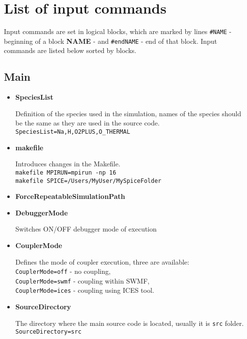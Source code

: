%
%

\chapter{List of input commands}

Input commands are set in logical blocks, which are
marked by lines \texttt{\#NAME} - beginning of 
a block {\bf NAME} - and \texttt{\#endNAME} - end
of that block. Input commands are listed below 
sorted by blocks.



\section{Main}

\begin{itemize}

\item {\bf SpeciesList}

Definition of the species used in the simulation, names of the species should
be the same as they are used in the source code. \\
{\tt SpeciesList=Na,H,O2PLUS,O\_THERMAL}

\item {\bf makefile}

Introduces changes in the Makefile.\\
{\tt makefile MPIRUN=mpirun -np 16}\\
{\tt makefile SPICE=/Users/MyUser/MySpiceFolder}

\item {\bf ForceRepeatableSimulationPath}

\item {\bf DebuggerMode}

Switches ON/OFF debugger mode of execution

\item {\bf CouplerMode}

Defines the mode of coupler execution, three are available:
\\{\tt CouplerMode=off} - no coupling, 
\\{\tt CouplerMode=swmf} - coupling within SWMF, 
\\{\tt CouplerMode=ices} - coupling using ICES tool.

\item {\bf SourceDirectory}

The directory where the main source code is located, usually it is
{\tt src} folder.\\
{\tt SourceDirectory=src}


\end{itemize}

